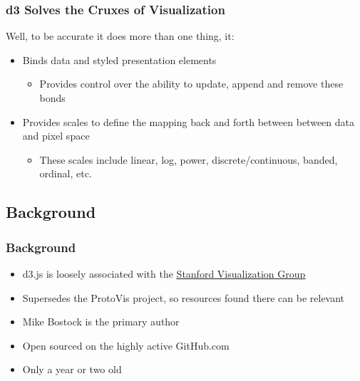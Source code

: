 \documentclass{beamer}
\begin{document}
\begin{frame}
\frametitle{d3 Solves the Cruxes of Visualization}
Well, to be accurate it does more than one thing, it:
\begin{itemize}
\item Binds data and styled presentation elements 
    \begin{itemize}
    \item Provides control over the ability to update, append and remove these bonds
    \end{itemize}
\item Provides scales to define the mapping back and forth between between data and pixel space
    \begin{itemize}
    \item These scales include linear, log, power, discrete/continuous, banded, ordinal, etc.
    \end{itemize}
\end{itemize}
\end{frame}






\subsection{Background}


\begin{frame}
\frametitle{Background}
\begin{itemize}
\item d3.js is loosely associated with the \href{http://vis.stanford.edu/}{\underline{Stanford Visualization Group}}
\item Supersedes the ProtoVis project, so resources found there can be relevant
\item Mike Bostock is the primary author
\item Open sourced on the highly active GitHub.com
\item Only a year or two old
\end{itemize}
\end{frame}
\end{document}
